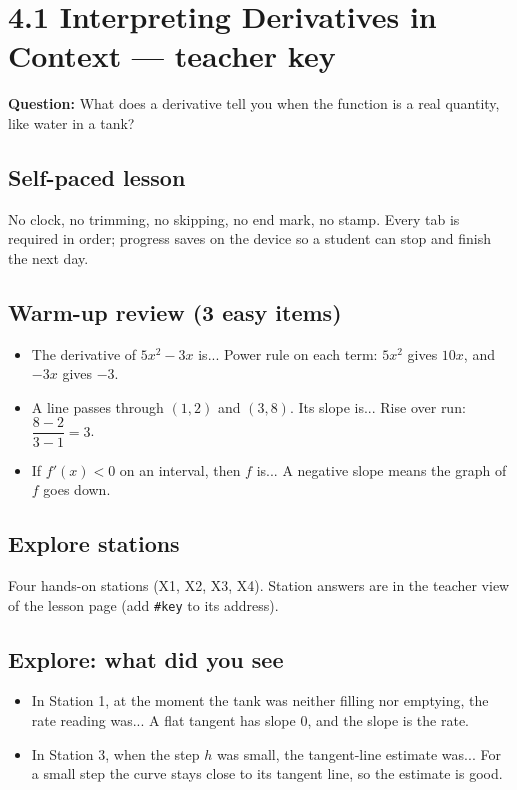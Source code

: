 \documentclass[11pt]{article}
\begin{document}
\section*{4.1 Interpreting Derivatives in Context --- teacher key}
\textbf{Question:} What does a derivative tell you when the function is a real quantity, like water in a tank?\par
\subsection*{Self-paced lesson}No clock, no trimming, no skipping, no end mark, no stamp. Every tab is required in order; progress saves on the device so a student can stop and finish the next day.\par
\subsection*{Warm-up review (3 easy items)}\begin{itemize}
\item The derivative of $5x^2-3x$ is...  Power rule on each term: $5x^2$ gives $10x$, and $-3x$ gives $-3$.
\item A line passes through $(1,2)$ and $(3,8)$. Its slope is...  Rise over run: $\dfrac{8-2}{3-1}=3$.
\item If $f'(x)<0$ on an interval, then $f$ is...  A negative slope means the graph of $f$ goes down.
\end{itemize}
\subsection*{Explore stations}Four hands-on stations (X1, X2, X3, X4). Station answers are in the teacher view of the lesson page (add \texttt{\#key} to its address).\par
\subsection*{Explore: what did you see}\begin{itemize}
\item In Station 1, at the moment the tank was neither filling nor emptying, the rate reading was...  A flat tangent has slope 0, and the slope is the rate.
\item In Station 3, when the step $h$ was small, the tangent-line estimate was...  For a small step the curve stays close to its tangent line, so the estimate is good.
\end{itemize}
\end{document}
